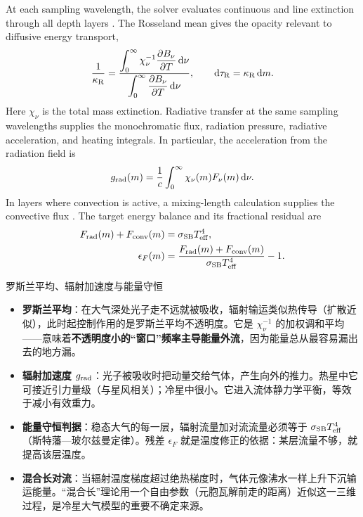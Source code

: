 \begin{EN}
At each sampling wavelength, the solver evaluates continuous and line
extinction through all depth layers \citep{Mihalas1978}. The Rosseland
mean gives the opacity relevant to diffusive energy transport,
\begin{equation}
\frac{1}{\kappa_{\rm R}}=
\frac{\displaystyle\int_0^\infty
      \chi_\nu^{-1}\frac{\partial B_\nu}{\partial T}\,\mathrm{d}\nu}
     {\displaystyle\int_0^\infty
      \frac{\partial B_\nu}{\partial T}\,\mathrm{d}\nu},
\qquad \mathrm{d}\tau_{\rm R}=\kappa_{\rm R}\,\mathrm{d}m .
\end{equation}
\noindent Here $\chi_\nu$ is the total mass extinction. Radiative transfer at
the same sampling wavelengths supplies the
monochromatic flux, radiation pressure, radiative acceleration, and heating
integrals. In particular, the acceleration from the radiation field is
\begin{equation}
g_{\rm rad}(m)=\frac{1}{c}\int_0^\infty
\chi_\nu(m)F_\nu(m)\,\mathrm{d}\nu .
\end{equation}
\noindent In layers where convection is active, a mixing-length calculation supplies
the convective flux \citep{BohmVitense1958,Mihalas1978,Gustafsson2008}. The target energy balance and its fractional residual are
\begin{equation}
\begin{aligned}
F_{\rm rad}(m)+F_{\rm conv}(m)
&=\sigma_{\rm SB}T_{\rm eff}^{4}, \\
\epsilon_F(m)
&=\frac{F_{\rm rad}(m)+F_{\rm conv}(m)}
        {\sigma_{\rm SB}T_{\rm eff}^{4}}-1 .
\end{aligned}
\end{equation}
\end{EN}

\begin{physbox}{罗斯兰平均、辐射加速度与能量守恒}
\begin{itemize}
\item \textbf{罗斯兰平均}：在大气深处光子走不远就被吸收，辐射输运类似热传导（扩散近似），此时起控制作用的是罗斯兰平均不透明度。它是 $\chi_\nu^{-1}$ 的加权调和平均——意味着\textbf{不透明度小的“窗口”频率主导能量外流}，因为能量总从最容易漏出去的地方漏。
\item \textbf{辐射加速度 $g_{\rm rad}$}：光子被吸收时把动量交给气体，产生向外的推力。热星中它可接近引力量级（与星风相关）；冷星中很小。它进入流体静力学平衡，等效于减小有效重力。
\item \textbf{能量守恒判据}：稳态大气的每一层，辐射流量加对流流量必须等于 $\sigma_{\rm SB}T_{\rm eff}^4$（斯特藩—玻尔兹曼定律）。残差 $\epsilon_F$ 就是温度修正的依据：某层流量不够，就提高该层温度。
\item \textbf{混合长对流}：当辐射温度梯度超过绝热梯度时，气体元像沸水一样上升下沉输运能量。“混合长”理论用一个自由参数（元胞瓦解前走的距离）近似这一三维过程，是冷星大气模型的重要不确定来源。
\end{itemize}
\end{physbox}

